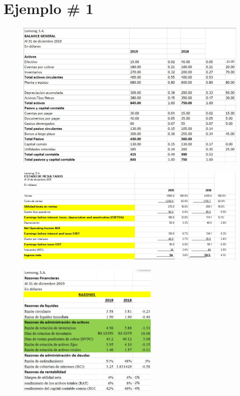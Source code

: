 \documentclass{article}
\begin{document}
\section{Ejemplo \# 1}
\begin{center}
    \begin{figure}[H]
        \centering
        \includegraphics[width=\textwidth]{bg.jpeg}
    \end{figure}
    \begin{figure}[H]
        \centering
        \includegraphics[width=\textwidth]{er.jpeg}
    \end{figure}
\end{center}
\newpage
\begin{figure}
    \begin{center}
        \includegraphics[width=0.6\textwidth]{rf.jpeg}
    \end{center}
\end{figure}
\end{document}
